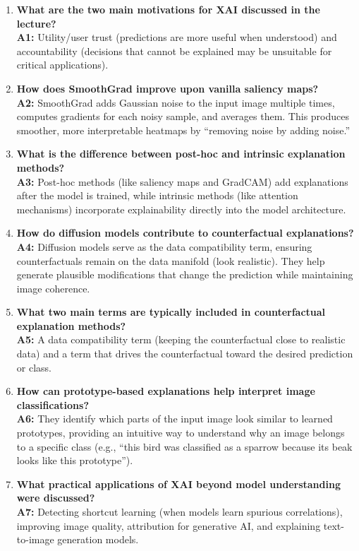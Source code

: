 \begin{enumerate}
    \item \textbf{What are the two main motivations for XAI discussed in the lecture?} \\
    \textbf{A1:} Utility/user trust (predictions are more useful when understood) and accountability (decisions that cannot be explained may be unsuitable for critical applications).

    \item \textbf{How does SmoothGrad improve upon vanilla saliency maps?} \\
    \textbf{A2:} SmoothGrad adds Gaussian noise to the input image multiple times, computes gradients for each noisy sample, and averages them. This produces smoother, more interpretable heatmaps by “removing noise by adding noise.”

    \item \textbf{What is the difference between post-hoc and intrinsic explanation methods?} \\
    \textbf{A3:} Post-hoc methods (like saliency maps and GradCAM) add explanations after the model is trained, while intrinsic methods (like attention mechanisms) incorporate explainability directly into the model architecture.

    \item \textbf{How do diffusion models contribute to counterfactual explanations?} \\
    \textbf{A4:} Diffusion models serve as the data compatibility term, ensuring counterfactuals remain on the data manifold (look realistic). They help generate plausible modifications that change the prediction while maintaining image coherence.

    \item \textbf{What two main terms are typically included in counterfactual explanation methods?} \\
    \textbf{A5:} A data compatibility term (keeping the counterfactual close to realistic data) and a term that drives the counterfactual toward the desired prediction or class.

    \item \textbf{How can prototype-based explanations help interpret image classifications?} \\
    \textbf{A6:} They identify which parts of the input image look similar to learned prototypes, providing an intuitive way to understand why an image belongs to a specific class (e.g., “this bird was classified as a sparrow because its beak looks like this prototype”).

    \item \textbf{What practical applications of XAI beyond model understanding were discussed?} \\
    \textbf{A7:} Detecting shortcut learning (when models learn spurious correlations), improving image quality, attribution for generative AI, and explaining text-to-image generation models.
\end{enumerate}
